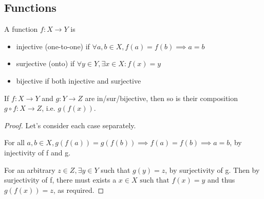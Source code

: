 \documentclass[11pt]{article}
\begin{document}
\subsection{Functions}
\begin{definition}
  A function \(f:X \rightarrow Y\) is 
  \begin{itemize}
    \item injective (one-to-one) if \(\forall a,b \in X, f(a)=f(b) \implies a=b\)
    \item surjective (onto) if \(\forall y \in Y, \exists x \in X : f(x)=y\)
    \item bijective if both injective and surjective
  \end{itemize}  
\end{definition}

\begin{theorem}
  If \(f:X \rightarrow Y\) and \(g:Y \rightarrow Z\) are in/sur/bijective, then so is their composition \(g \circ f:X \rightarrow Z\), i.e. \(g(f(x))\).
\end{theorem}
\begin{proof}
  Let's consider each case separately.

  For all \(a,b \in X, g(f(a))=g(f(b)) \implies f(a)=f(b) \implies a = b\), by injectivity of f and g.

  For an arbitrary \(z \in Z, \exists y \in Y\) such that \(g(y)=z\), by surjectivity of g. Then by surjectivity of f, there must exists a \(x \in X \text{ such that } f(x)=y\) and thus \(g(f(x))=z\), as required.
\end{proof}
\end{document}
